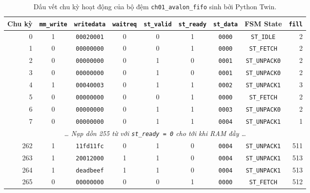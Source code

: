 \begin{table}[H]
\centering
\caption{Dấu vết chu kỳ hoạt động của bộ đệm \texttt{ch01\_avalon\_fifo} sinh bởi Python Twin.}
\label{tab:ch01_trace}
\footnotesize
\setlength{\tabcolsep}{4.5pt}
\begin{tabular}{rcccccccr}
\toprule
\textbf{Chu kỳ} & \textbf{\texttt{mm\_write}} & \textbf{\texttt{writedata}} & \textbf{\texttt{waitreq}} & \textbf{\texttt{st\_valid}} & \textbf{\texttt{st\_ready}} & \textbf{\texttt{st\_data}} & \textbf{FSM State} & \textbf{\texttt{fill}} \\
\midrule
0   & 1 & \texttt{00020001} & 0 & 0 & 1 & \texttt{0000} & \texttt{ST\_IDLE}   & 2 \\
1   & 0 & \texttt{00000000} & 0 & 0 & 1 & \texttt{0000} & \texttt{ST\_FETCH}  & 2 \\
2   & 0 & \texttt{00000000} & 0 & 1 & 0 & \texttt{0001} & \texttt{ST\_UNPACK0}& 2 \\
3   & 0 & \texttt{00000000} & 0 & 1 & 0 & \texttt{0001} & \texttt{ST\_UNPACK0}& 2 \\
4   & 1 & \texttt{00040003} & 0 & 1 & 1 & \texttt{0002} & \texttt{ST\_UNPACK1}& 3 \\
5   & 0 & \texttt{00000000} & 0 & 0 & 1 & \texttt{0000} & \texttt{ST\_FETCH}  & 2 \\
6   & 0 & \texttt{00000000} & 0 & 1 & 1 & \texttt{0003} & \texttt{ST\_UNPACK0}& 2 \\
7   & 0 & \texttt{00000000} & 0 & 1 & 1 & \texttt{0004} & \texttt{ST\_UNPACK1}& 1 \\
\midrule
\multicolumn{9}{c}{\textit{\dots{} Nạp dồn 255 từ với \texttt{st\_ready = 0} cho tới khi RAM đầy \dots{}}} \\
\midrule
262 & 1 & \texttt{11fd11fc} & 0 & 1 & 0 & \texttt{0004} & \texttt{ST\_UNPACK1}& 511 \\
263 & 1 & \texttt{20012000} & 1 & 1 & 0 & \texttt{0004} & \texttt{ST\_UNPACK1}& 513 \\
264 & 1 & \texttt{deadbeef} & 1 & 1 & 0 & \texttt{0004} & \texttt{ST\_UNPACK1}& 513 \\
265 & 0 & \texttt{00000000} & 0 & 0 & 1 & \texttt{0000} & \texttt{ST\_FETCH}  & 512 \\
\bottomrule
\end{tabular}
\end{table}

